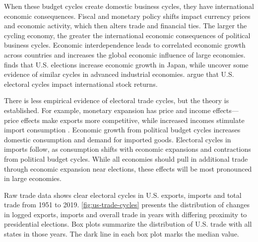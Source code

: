 \documentclass[12pt]{article}
\begin{document}
When these budget cycles create domestic business cycles, they have international economic consequences.
Fiscal and monetary policy shifts impact currency prices and economic activity, which then alters trade and financial ties. 
The larger the cycling economy, the greater the international economic consequences of political business cycles.
Economic interdependence leads to correlated economic growth across countries \citep{ArtisZhang1999, Kayser2006} and increases the global economic influence of large economies. 
\citet{Ito1991} finds that U.S. elections increase economic growth in Japan, while \citet{ThompsonZuk1983} uncover some evidence of similar cycles in advanced industrial economies.
\citet{FoersterSchmitz1997} argue that U.S. electoral cycles impact international stock returns.


There is less empirical evidence of electoral trade cycles, but the theory is established.
For example, monetary expansion has price and income effects--- price effects make exports more competitive, while increased incomes stimulate import consumption \citep{Sumner2021}.
Economic growth from political budget cycles increases domestic consumption and demand for imported goods. 
Electoral cycles in imports follow, as consumption shifts with economic expansions and contractions from political budget cycles.  
While all economies should pull in additional trade through economic expansion near elections, these effects will be most pronounced in large economies. 


Raw trade data shows clear electoral cycles in U.S. exports, imports and total trade from 1951 to 2019. 
\autoref{fig:us-trade-cycles} presents the distribution of changes in logged exports, imports and overall trade in years with differing proximity to presidential elections.
Box plots summarize the distribution of U.S. trade with all states in those years. 
The dark line in each box plot marks the median value. 
\end{document}
